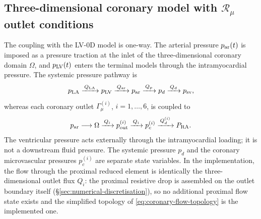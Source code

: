 \documentclass[lineno]{jfm}
\begin{document}
\subsection{Three-dimensional coronary model with
\texorpdfstring{$\mathcal{R}_{\mu}$}{Rmu} outlet conditions}
\label{sec:ApplicationII}
The coupling with the LV-0D model is one-way. The arterial pressure
$p_{\rm ar}(t)$ is imposed as a pressure traction at the inlet of the
three-dimensional coronary domain $\Omega$, and
$p_{\rm LV}(t)$ enters the terminal models through the intramyocardial
pressure.
The systemic pressure pathway is
\begin{equation}
p_{\rm LA}
\xrightarrow{\,Q_{\rm LA}\,}
p_{\rm LV}
\xrightarrow{\,Q_{\rm ar}\,}
p_{\rm ar}
\xrightarrow{\,Q_p\,}
p_d
\xrightarrow{\,Q_d\,}
p_{\rm sv},
\label{eq:lv0d-flow-topology}
\end{equation}
whereas each coronary outlet
$\Gamma_\mu^{(i)}$, $i=1,\ldots,6$, is coupled to
\begin{equation}
p_{\rm ar}
\longrightarrow
\Omega
\xrightarrow{\,Q_i\,}
p_{\rm out}^{(i)}
\xrightarrow{\,Q_i\,}
p_c^{(i)}
\xrightarrow{\,Q_d^{(i)}\,}
P_{\rm RA}.
\label{eq:coronary-flow-topology}
\end{equation}
The ventricular pressure acts externally through the intramyocardial loading;
it is not a downstream fluid pressure. The systemic pressure $p_d$ and the
coronary microvascular pressures $p_c^{(i)}$ are separate state variables.
In the implementation, the flow through the proximal reduced element is
identically the three-dimensional outlet flux $Q_i$: the proximal resistive
drop is assembled on the outlet boundary itself
(\S\ref{sec:numerical-discretisation}), so no additional proximal flow state
exists and the simplified topology of
\eqref{eq:coronary-flow-topology} is the implemented one.
\end{document}
